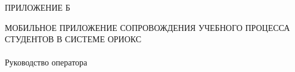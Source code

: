 \begin{flushright}
  ПРИЛОЖЕНИЕ Б
\end{flushright}
\vfill
\begin{center}
  \uppercase{Мобильное приложение сопровождения учебного процесса студентов в системе ОРИОКС}\\~\\
  Руководство оператора
\end{center}
\vfill

\setcounter{page}{1}
\thispagestyle{empty}

